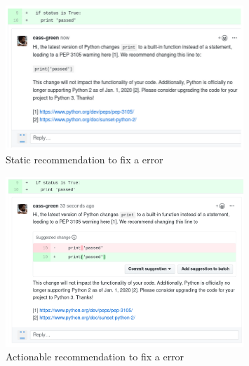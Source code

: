 \begin{figure}[H]
\centering
	\includegraphics[width=0.8\textwidth]{Chapter-4/images/static.png}
	\caption{Static recommendation to fix a \PEP error}
	\label{fig:sorry2-static} 
\end{figure}

\begin{figure}[H]
\centering
	\includegraphics[width=0.8\textwidth]{Chapter-4/images/actionable.png}
	\caption{Actionable recommendation to fix a \PEP error}
	\label{fig:sorry2-action} 
\end{figure}